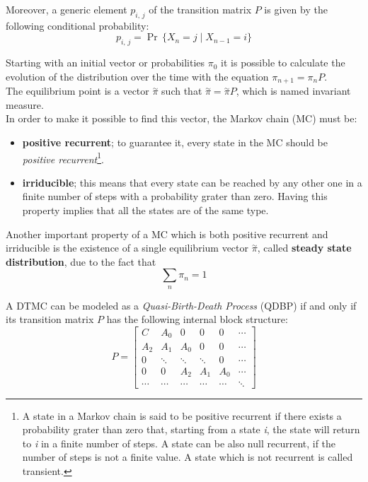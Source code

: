 Moreover, a generic element \(p_{i,\,j}\) of the transition matrix \( P \) is given by the following conditional probability:
\begin{equation*}
  p_{i,\,j} = \Pr\,\{X_{n} = j \mid X_{n-1} = i\}
\end{equation*}

Starting with an initial vector or probabilities \( \pi_{0} \) it is possible to calculate the evolution of the distribution over the time with the equation \( \pi_{n+1} = \pi_{n}P \).\\
The equilibrium point is a vector \( \overset{\sim}{\pi} \) such that \( \overset{\sim}{\pi} = \overset{\sim}{\pi}P \), which is named invariant measure.\\
In order to make it possible to find this vector, the Markov chain (MC) must be:
\begin{itemize}
  \item \textbf{positive recurrent}; to guarantee it, every state in the MC should be \emph{positive recurrent}\footnote{A state in a Markov chain is said to be positive recurrent if there exists a probability grater than zero that, starting from a state \emph{i}, the state will return to \emph{i} in a finite number of steps. A state can be also null recurrent, if the number of steps is not a finite value. A state which is not recurrent is called transient.}. 
  \item \textbf{irriducible}; this means that every state can be reached by any other one in a finite number of steps with a probability grater than zero. Having this property implies that all the states are of the same type.  
\end{itemize}

Another important property of a MC which is both positive recurrent and irriducible is the existence of a single equilibrium vector \( \overset{\sim}{\pi} \), called \textbf{steady state distribution}, due to the fact that
\begin{equation*}
  \displaystyle\sum_{n} \pi_{n} = 1
\end{equation*}

A DTMC can be modeled as a \emph{Quasi-Birth-Death Process} (QDBP) if and only if its transition matrix \( P \) has the following internal block structure:
\begin{equation*} \label{transitionmatrix}
  P = 
  \begin{bmatrix}
    C & A_{0} & 0 & 0 & 0 & \cdots \\
    A_{2} & A_{1} & A_{0} & 0 & 0 & \cdots \\
    0 & \ddots & \ddots & \ddots & 0 & \cdots \\
    0 & 0 & A_{2} & A_{1} & A_{0} & \cdots \\
    \cdots & \cdots & \cdots & \cdots & \cdots & \ddots
  \end{bmatrix}
\end{equation*}

